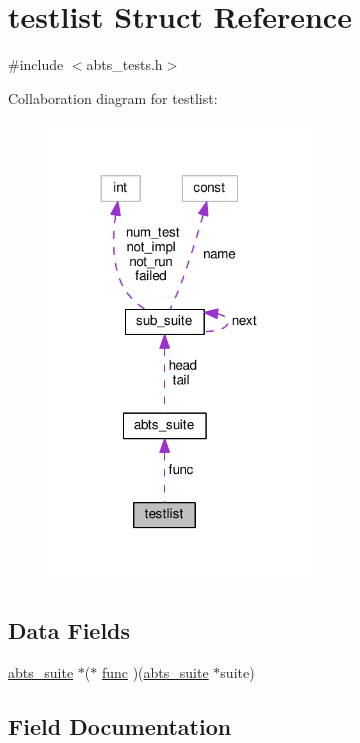 \hypertarget{structtestlist}{}\section{testlist Struct Reference}
\label{structtestlist}


{\ttfamily \#include $<$abts\+\_\+tests.\+h$>$}



Collaboration diagram for testlist\+:
\nopagebreak
\begin{figure}[H]
\begin{center}
\leavevmode
\includegraphics[width=197pt]{structtestlist__coll__graph}
\end{center}
\end{figure}
\subsection*{Data Fields}
\begin{DoxyCompactItemize}
\item 
\hyperlink{structabts__suite}{abts\+\_\+suite} $\ast$($\ast$ \hyperlink{structtestlist_acb880be9cb11bd3bffafeb246a24c846}{func} )(\hyperlink{structabts__suite}{abts\+\_\+suite} $\ast$suite)
\end{DoxyCompactItemize}


\subsection{Field Documentation}
